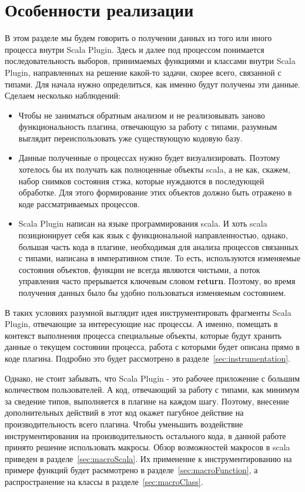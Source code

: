 \section{Особенности реализации}
\label{sec:features}

В этом разделе мы будем говорить о получении данных из того или иного процесса
внутри Scala Plugin.
Здесь и далее под процессом понимается последовательность выборов, принимаемых функциями и
классами внутри Scala Plugin, направленных на решение какой-то задачи, скорее
всего, связанной с типами.
Для начала нужно определиться, как именно будут получены эти данные.
Сделаем несколько наблюдений:

\begin{itemize}
  \item Чтобы не заниматься обратным анализом и не реализовывать заново функциональность плагина,
  отвечающую за работу с типами, разумным выглядит переиспользовать уже существующую кодовую базу.
  \item Данные полученные о процессах нужно будет визуализировать.
  Поэтому хотелось бы их получать как полноценные объекты scala, а не как, скажем,
  набор снимков состояния стэка, которые нуждаются в последующей обработке.
  Для этого формирование этих объектов должно быть отражено в коде рассматриваемых процессов.
  \item Scala Plugin написан на языке программирования scala.
  И хоть scala позиционирует себя как язык с функциональной направленностью,
  однако, большая часть кода в плагине, необходимая для анализа процессов связанных с типами,
  написана в императивном стиле.
  То есть, используются изменяемые состояния объектов, функции не всегда являются чистыми,
  а поток управления часто прерывается ключевым словом \textbf{return}.
  Поэтому, во время получения данных было бы удобно пользоваться изменяемым состоянием.
\end{itemize}

В таких условиях разумной выглядит идея инструментировать фрагменты Scala Plugin,
отвечающие за интересующие нас процессы.
А именно, помещать в контекст выполнения процесса специальные объекты,
которые будут хранить данные о текущем состоянии процесса,
работа с которыми будет описана прямо в коде плагина.
Подробно это будет рассмотрено в разделе~\ref{sec:instrumentation}.

Однако, не стоит забывать, что Scala Plugin - это рабочее приложение
с большим количеством пользователей.
А код, отвечающий за работу с типами, как минимум за сведение типов,
выполняется в плагине на каждом шагу.
Поэтому, внесение дополнительных действий в этот код окажет пагубное действие
на производительность всего плагина.
Чтобы уменьшить воздействие инструментирования на производительность остального кода,
в данной работе принято решение использовать макросы.
Обзор возможностей макросов в scala приведен в разделе~\ref{sec:macroScala}.
Их применение к инструментированию на примере функций будет расммотрено в
разделе~\ref{sec:macroFunction}, а распространение на классы
в разделе~\ref{sec:macroClass}.

